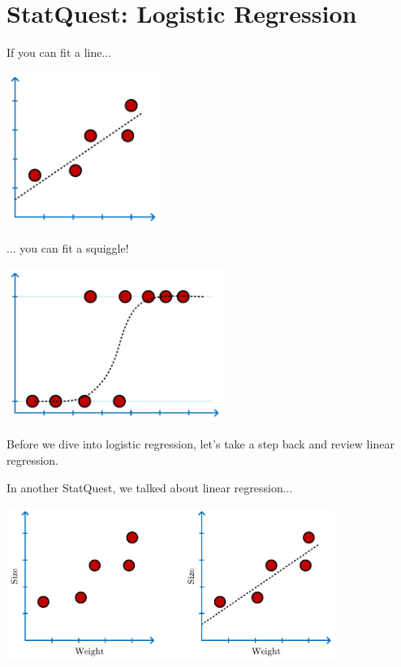 \documentclass[
	final,
	a4paper,
	oneside,
	parskip=full,
	headings=standardclasses,
	headings=big,
	pointednumbers
]{scrartcl}
\begin{document}
    \section*{StatQuest: Logistic Regression}

    If you can fit a line...

    \begin{center}
        \includegraphics[height=5cm]{StatQuest_Logistic_Regression_Linear.pdf}
    \end{center}

    ... you can fit a squiggle!

    \begin{center}
        \includegraphics[height=5cm]{StatQuest_Logistic_Regression_Logistic.pdf}
    \end{center}

     Before we dive into logistic regression, let's take a step back and review linear regression.

    In another StatQuest, we talked about linear regression...  

    \begin{center}
        \includegraphics[height=5cm]{StatQuest_Logistic_Regression_Weight_Size.pdf}
    \end{center}
\end{document}
